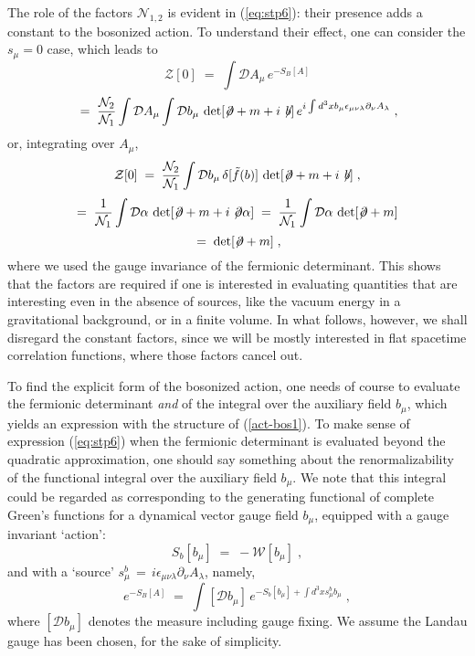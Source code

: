\documentclass[a4paper,12pt]{article}
\begin{document}
The role of the factors ${\mathcal N}_{1,2}$ is evident in
(\ref{eq:stp6}): their presence adds a constant to the bosonized
action. To understand their effect, one can consider the $s_\mu =0$
case, which leads to
$$
{\mathcal Z}[0] \;=\; \int {\mathcal D}A_\mu \, e^{-S_B[A]}
$$
\begin{equation}
 \label{eq:s0}
\;=\;  \frac{{\mathcal N}_2}{{\mathcal N}_1}
   \int {\mathcal D}A_\mu  \int {\mathcal D} b_\mu \,
  \det[\not\!\partial + m + i \not \! b ]\,
 e^{i\int d^3 x b_\mu \epsilon_{\mu\nu\lambda} \partial_\nu  A_\lambda} \;,
\end{equation}
or, integrating over $A_\mu$,
$$
{\mathcal Z}[0] \;=\; \frac{{\mathcal N}_2}{{\mathcal N}_1} \int
{\mathcal D} b_\mu \,\delta[{\tilde f}(b)] \, \det[\not\!\partial + m
+ i \not \! b ] \;,
$$
$$
=\; \frac{1}{{\mathcal N}_1} \int {\mathcal D}\alpha \,
\det[\not\!\partial + m + i \not \! \partial \alpha ] \;=\;
\frac{1}{{\mathcal N}_1} \int {\mathcal D}\alpha \,
\det[\not\!\partial + m ]
$$
\begin{equation}
 \;=\; \det[\not\!\partial + m ] \;,
\end{equation}
where we used the gauge invariance of the fermionic determinant. This
shows that the factors are required if one is interested in evaluating
quantities that are interesting even in the absence of sources, like
the vacuum energy in a gravitational background, or in a finite
volume. In what follows, however, we shall disregard the constant
factors, since we will be mostly interested in flat spacetime
correlation functions, where those factors cancel out.

To find the explicit form of the bosonized action, one needs of course
to evaluate the fermionic determinant {\em and\/} of the integral over
the auxiliary field $b_\mu$, which yields an expression with the
structure of (\ref{act-bos1}). To make sense of expression
(\ref{eq:stp6}) when the fermionic determinant is evaluated beyond the
quadratic approximation, one should say something about the
renormalizability of the functional integral over the auxiliary field
$b_\mu$. We note that this integral could be regarded as corresponding
to the generating functional of complete Green's functions for a
dynamical vector gauge field $b_\mu$, equipped with a gauge invariant
`action':
\begin{equation}
  \label{eq:defsb}
   S_b[b_\mu]\;=\; - {\mathcal W}[b_\mu] \;,
\end{equation}
and with a `source' $s^{b}_\mu\,=\,i \epsilon_{\mu\nu\lambda}\partial_\nu
A_\lambda$, namely,
\begin{equation}
  \label{eq:fintb}
  e^{-S_B[A]} \;=\; \int [ {\mathcal D}b_\mu ]\, e^{- S_b[b_\mu] + \int
    d^3x  s^{b}_\mu b_\mu} \;,
\end{equation}
where $[{\mathcal D}b_\mu]$ denotes the measure including gauge
fixing. We assume the Landau gauge has been chosen, for the sake of
simplicity.
\end{document}
